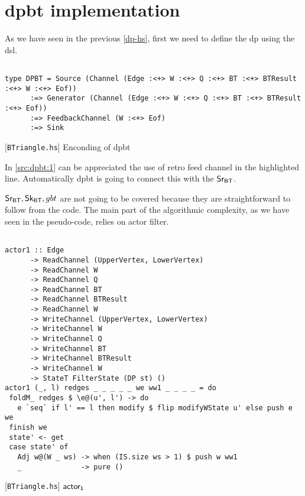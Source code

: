  
\section{\acrshort{dpbt} implementation}
As we have seen in the previous \autoref{dp-hs}, first we need to define the \acrshort{dp} using the \acrshort{dsl}.

\begin{listing}[H]
\begin{verbatim}

type DPBT = Source (Channel (Edge :<+> W :<+> Q :<+> BT :<+> BTResult :<+> W :<+> Eof))
      :=> Generator (Channel (Edge :<+> W :<+> Q :<+> BT :<+> BTResult :<+> Eof))
      :=> FeedbackChannel (W :<+> Eof)
      :=> Sink

\end{verbatim}
\caption{[\texttt{BTriangle.hs}] Enconding of \acrshort{dpbt}}
\label{src:dpbt:1}
\end{listing}

In \autoref{src:dpbt:1} can be appreciated the use of retro feed channel in the highlighted line. 
Automatically \acrshort{dpbt} is going to connect this with the $\mathsf{Sr_{BT}}$.

$\mathsf{Sr_{BT}}, \mathsf{Sk_{BT}}, gbt$ are not going to be covered because they are straightforward to follow from the code. 
The main part of the algorithmic complexity, as we have seen in the pseudo-code, relies on actor filter.

\begin{listing}[H]
\begin{verbatim}

actor1 :: Edge
      -> ReadChannel (UpperVertex, LowerVertex)
      -> ReadChannel W
      -> ReadChannel Q
      -> ReadChannel BT
      -> ReadChannel BTResult
      -> ReadChannel W
      -> WriteChannel (UpperVertex, LowerVertex)
      -> WriteChannel W
      -> WriteChannel Q
      -> WriteChannel BT
      -> WriteChannel BTResult
      -> WriteChannel W
      -> StateT FilterState (DP st) ()
actor1 (_, l) redges _ _ _ _ _ we ww1 _ _ _ _ = do
 foldM_ redges $ \e@(u', l') -> do
   e `seq` if l' == l then modify $ flip modifyWState u' else push e we
 finish we
 state' <- get
 case state' of
   Adj w@(W _ ws) -> when (IS.size ws > 1) $ push w ww1
   _              -> pure ()

\end{verbatim}
\caption{[\texttt{BTriangle.hs}] $\aaa$}
\label{src:dpbt:2}
\end{listing}

